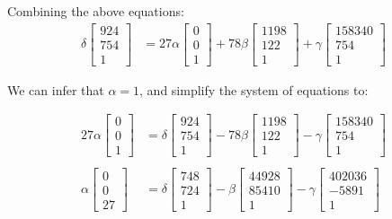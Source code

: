 \documentclass[12pt, oneside]{article}
\begin{document}
  Combining the above equations:
  \begin{align*}
  \delta  \begin{bmatrix}
  924   \\
  754   \\
  1  
  \end{bmatrix}  &= 27\alpha  \begin{bmatrix}
  0  \\
  0   \\
  1  
  \end{bmatrix} +
  78\beta \begin{bmatrix}
  1198   \\
  122   \\
  1  
  \end{bmatrix} + \gamma  \begin{bmatrix}
    158340  \\
    754 \\
    1 
\end{bmatrix}
  \end{align*} 

We can infer that $\alpha = 1$, and simplify the system of equations to:
  
\begin{align*}
27\alpha  \begin{bmatrix} 0  \\ 0   \\ 1   \end{bmatrix} &= 
\delta  \begin{bmatrix} 924   \\ 754   \\  1  \end{bmatrix} -
78\beta \begin{bmatrix} 1198   \\ 122   \\ 1 \end{bmatrix} - 
\gamma  \begin{bmatrix} 158340  \\ 754 \\ 1  \end{bmatrix} \\ \\ %
\alpha  \begin{bmatrix}
0  \\
0   \\
27  
\end{bmatrix} &=
\delta  \begin{bmatrix}
748   \\
724   \\
1  
\end{bmatrix} -
\beta \begin{bmatrix}
44928  \\
85410   \\
1  
\end{bmatrix} - \gamma  \begin{bmatrix}
402036  \\
-5891 \\
1 
\end{bmatrix}
\end{align*} 
\end{document}
